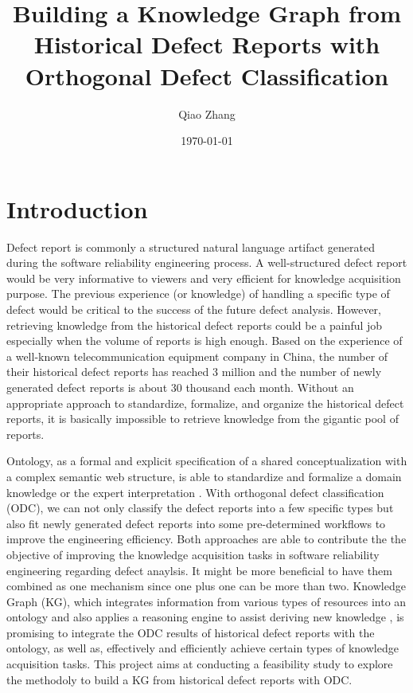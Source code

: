 \documentclass[12pt] {article}
\begin{document}
\title{Building a Knowledge Graph from Historical Defect Reports with Orthogonal Defect Classification}
\author{Qiao Zhang}
\date \today
\maketitle

\thispagestyle{empty}

\bigskip
\pagebreak
\setcounter{page}{1}
\section{Introduction}
Defect report is commonly a structured natural language artifact generated during the software reliability engineering process.
A well-structured defect report would be very informative to viewers and very efficient for knowledge acquisition purpose.
The previous experience (or knowledge) of handling a specific type of defect would be critical to the success of the future defect analysis.
However, retrieving knowledge from the historical defect reports could be a painful job especially when the volume of reports is high enough.
Based on the experience of a well-known telecommunication equipment company in China, the number of their historical defect reports has reached 3 million and the number of newly generated defect reports is about 30 thousand each month.
Without an appropriate approach to standardize, formalize, and organize the historical defect reports, it is basically impossible to retrieve knowledge from the gigantic pool of reports.\par

Ontology, as a formal and explicit specification of a shared conceptualization with a complex semantic web structure, is able to standardize and formalize a domain knowledge or the expert interpretation \cite{christina2016an}.
With orthogonal defect classification (ODC), we can not only classify the defect reports into a few specific types but also fit newly generated defect reports into some pre-determined workflows to improve the engineering efficiency.
Both approaches are able to contribute the the objective of improving the knowledge acquisition tasks in software reliability engineering regarding defect anaylsis. 
It might be more beneficial to have them combined as one mechanism since one plus one can be more than two.
Knowledge Graph (KG), which integrates information from various types of resources into an ontology and also applies a reasoning engine to assist deriving new knowledge \cite{ehrlinger2016towards}, is promising to integrate the ODC results of historical defect reports with the ontology, as well as, effectively and efficiently achieve certain types of knowledge acquisition tasks.
This project aims at conducting a feasibility study to explore the methodoly to build a KG from historical defect reports with ODC.
\end{document}
